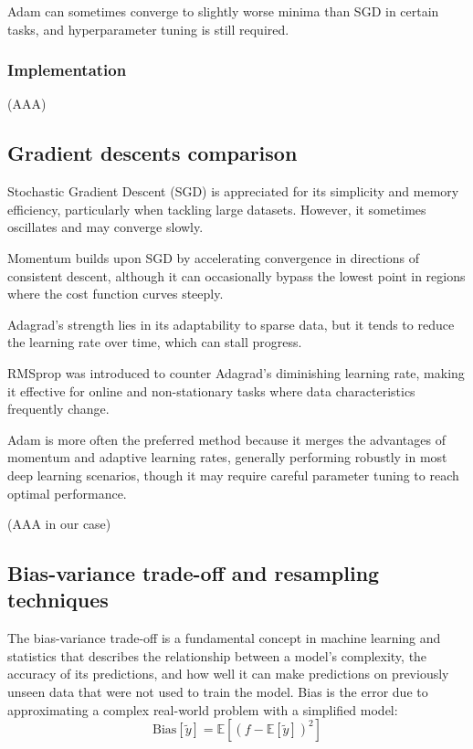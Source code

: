 \documentclass[%
 reprint,            %
 amsmath,amssymb,
 aps,
]{revtex4-2}
\begin{document}
Adam can sometimes converge to slightly worse minima than SGD in certain tasks, and hyperparameter tuning is still required.
\subsubsection{Implementation}
(AAA)

\subsection{Gradient descents comparison}
Stochastic Gradient Descent (SGD) is appreciated for its simplicity and memory efficiency, particularly when tackling large datasets. However, it sometimes oscillates and may converge slowly. 

Momentum builds upon SGD by accelerating convergence in directions of consistent descent, although it can occasionally bypass the lowest point in regions where the cost function curves steeply. 

Adagrad's strength lies in its adaptability to sparse data, but it tends to reduce the learning rate over time, which can stall progress. 

RMSprop was introduced to counter Adagrad's diminishing learning rate, making it effective for online and non-stationary tasks where data characteristics frequently change. 

Adam is more often the preferred method because it merges the advantages of momentum and adaptive learning rates, generally performing robustly in most deep learning scenarios, though it may require careful parameter tuning to reach optimal performance.

(AAA in our case)

\subsection{Bias-variance trade-off and resampling techniques}

The bias-variance trade-off is a fundamental concept in machine learning and statistics that describes the relationship between a model's complexity, the accuracy of its predictions, and how well it can make predictions on previously unseen data that were not used to train the model. 
Bias is the error due to approximating a complex real-world problem with a simplified model: 
$$\mathrm{Bias}[\tilde y]= \mathbb{E}[(f-\mathbb{E}[\tilde y])^2]$$
\end{document}
